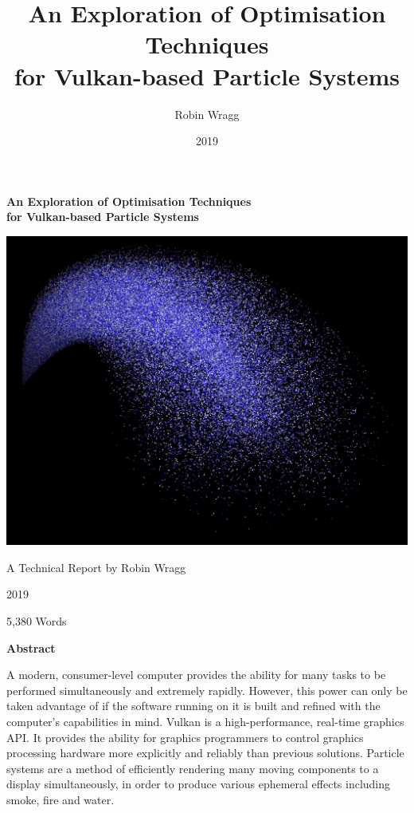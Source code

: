 \documentclass[11pt, a4paper, twocolumn]{article}
\begin{document}
\onecolumn

\title{\sffamily\bfseries An Exploration of Optimisation Techniques\\for Vulkan-based Particle Systems}
\author{Robin Wragg}
\date{2019}

\begin{center}

\vspace*{1cm}

{\sffamily\bfseries\huge An Exploration of Optimisation Techniques\\for Vulkan-based Particle Systems}

\vspace{1cm}

\includegraphics[width=14cm]{particles}

\vspace{1cm}

{\Large A Technical Report by Robin Wragg}

\vspace{0.35cm}

{\Large 2019}

\vspace{0.35cm}

{\Large 5,380 Words}

\vspace{1cm}

{\sffamily\bfseries\LARGE Abstract}
\end{center}

A modern, consumer-level computer provides the ability for many tasks to be performed simultaneously and extremely rapidly. However, this power can only be taken advantage of if the software running on it is built and refined with the computer's capabilities in mind. Vulkan is a high-performance, real-time graphics API. It provides the ability for graphics programmers to control graphics processing hardware more explicitly and reliably than previous solutions. Particle systems are a method of efficiently rendering many moving components to a display simultaneously, in order to produce various ephemeral effects including smoke, fire and water.
\end{document}
